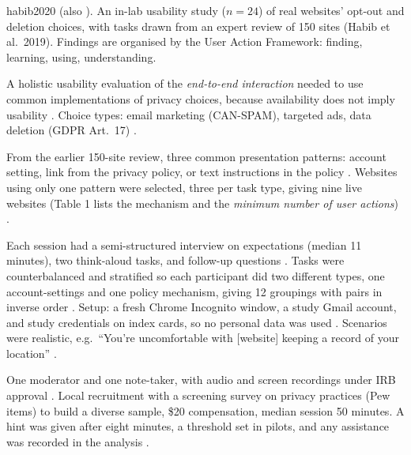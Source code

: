 \begin{papercard}{habib2020}
  (also  ). An in-lab usability study ($n=24$) of real websites' opt-out and deletion choices, with tasks drawn from an expert review of 150 sites (Habib et al.\ 2019). Findings are organised by the User Action Framework: finding, learning, using, understanding.

 A holistic usability evaluation of the \emph{end-to-end interaction} needed to use common implementations of privacy choices, because availability does not imply usability . Choice types: email marketing (CAN-SPAM), targeted ads, data deletion (GDPR Art.\ 17) .

 From the earlier 150-site review, three common presentation patterns: account setting, link from the privacy policy, or text instructions in the policy . Websites using only one pattern were selected, three per task type, giving nine live websites (Table 1 lists the mechanism and the \emph{minimum number of user actions}) .

 Each session had a semi-structured interview on expectations (median 11 minutes), two think-aloud tasks, and follow-up questions . Tasks were counterbalanced and stratified so each participant did two different types, one account-settings and one policy mechanism, giving 12 groupings with pairs in inverse order . Setup: a fresh Chrome Incognito window, a study Gmail account, and study credentials on index cards, so no personal data was used . Scenarios were realistic, e.g.\ ``You're uncomfortable with [website] keeping a record of your location'' .

 One moderator and one note-taker, with audio and screen recordings under IRB approval . Local recruitment with a screening survey on privacy practices (Pew items) to build a diverse sample, \$20 compensation, median session 50 minutes. A hint was given after eight minutes, a threshold set in pilots, and any assistance was recorded in the analysis .


\end{papercard}
